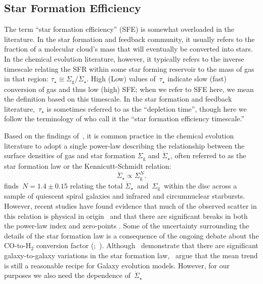 \documentclass[draft2.tex]{subfiles}
\begin{document}
\subsection{Star Formation Efficiency} 
\label{sec:methods:sfe} 
The term ``star formation efficiency'' (SFE) is somewhat overloaded in the 
literature. 
In the star formation and feedback community, it usually refers to the fraction 
of a molecular cloud's mass that will eventually be converted into stars. 
In the chemical evolution literature, however, it typically refers to the 
inverse timescale relating the SFR within some star forming reservoir to the 
mass of gas in that region: 
$\tau_\star \equiv \Sigma_\text{g}/\dot{\Sigma}_\star$. 
High (Low) values of~$\tau_\star$ indicate slow (fast) conversion of gas and 
thus low (high) SFE; when we refer to SFE here, we mean the definition based on 
this timescale. 
In the star formation and feedback literature,~$\tau_\star$ is sometimes 
referred to as the ``depletion time'', though here we follow the terminology of 
\citet{Weinberg2017} who call it the ``star formation efficiency timescale.'' 
\par 
Based on the findings of~\citet{Kennicutt1998}, it is common practice in the 
chemical evolution literature to adopt a single power-law describing the 
relationship between the surface densities of gas and star formation 
$\Sigma_\text{g}$ and $\dot{\Sigma}_\star$, often referred to as the star 
formation law or the Kennicutt-Schmidt relation: 
\begin{equation} 
\dot{\Sigma}_\star \propto \Sigma_\text{g}^N. 
\end{equation} 
\citet{Kennicutt1998} finds~$N = 1.4 \pm 0.15$ relating the total 
$\dot{\Sigma}_\star$~and~$\Sigma_\text{g}$~within the disc across a sample of 
quiescent spiral galaxies and infrared and circumnuclear starbursts. 
However, recent studies have found evidence that much of the observed scatter 
in this relation is physical in origin~\citep{delosReyes2019} and that there 
are significant breaks in both the power-law index and zero-points 
\citep{Kennicutt2021}. 
Some of the uncertainty surrounding the details of the star formation law is a 
consequence of the ongoing debate about the CO-to-H$_2$ conversion factor 
(\citealp{Kennicutt2012};~\citealp*{Liu2015}). 
Although~\citet{Ellison2021} demonstrate that there are significant 
galaxy-to-galaxy variations in the star formation law,~\citet{delosReyes2019} 
argue that the mean trend is still a reasonable recipe for Galaxy evolution 
models. 
However, for our purposes we also need the dependence of~$\dot{\Sigma}_\star$ 
\end{document}
